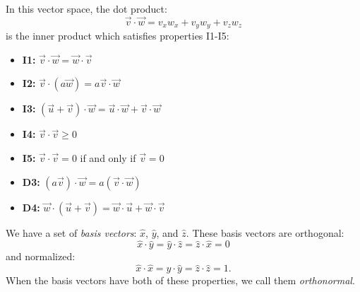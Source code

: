 \documentclass[12pt]{book}
\begin{document}
\noindent
In this vector space, the dot product:
\begin{displaymath}
\vec{v} \cdot \vec{w} = v_x w_x + v_y w_y + v_z w_z 
\end{displaymath}
is the inner product which satisfies properties I1-I5:
\begin{itemize}
\item {\bf I1:} $\vec{v} \cdot \vec{w} = \vec{w} \cdot \vec{v}$
\item {\bf I2:} $\vec{v} \cdot \left(a\vec{w}\right) = a \vec{v} \cdot \vec{w}$
\item {\bf I3:} $\left(\vec{u} + \vec{v}\right) \cdot \vec{w} = \vec{u} \cdot \vec{w} + \vec{v} \cdot \vec{w} $
\item {\bf I4:} $\vec{v} \cdot \vec{v} \geq 0$
\item {\bf I5:} $\vec{v} \cdot \vec{v} = 0$ if and only if $\vec{v} = 0$
\item {\bf D3:} $\left(a\vec{v}\right) \cdot \vec{w} = a \left( \vec{v} \cdot \vec{w}\right) $
\item {\bf D4:} $\vec{w} \cdot \left(\vec{u} + \vec{v}\right)  = \vec{w} \cdot \vec{u} + \vec{w} \cdot \vec{v}$
\end{itemize}

\noindent
We have a set of {\em basis vectors}: $\hat{x}$, $\hat{y}$, and $\hat{z}$.  These basis vectors are orthogonal:
\begin{displaymath}
\hat{x} \cdot \hat{y} = \hat{y} \cdot \hat{z} = \hat{z} \cdot \hat{x} = 0
\end{displaymath}
and normalized:
\begin{displaymath}
\hat{x} \cdot \hat{x} = \hat{y} \cdot \hat{y} = \hat{z} \cdot \hat{z} = 1.
\end{displaymath}
When the basis vectors have both of these properties, we call them {\em orthonormal}.
\end{document}
